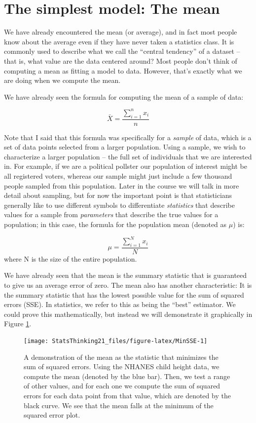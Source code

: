 \documentclass[12pt,]{book}
\theoremstyle{definition}
\theoremstyle{definition}
\theoremstyle{definition}
\theoremstyle{remark}
\begin{document}
\hypertarget{the-simplest-model-the-mean}{%
\section{The simplest model: The mean}\label{the-simplest-model-the-mean}}

We have already encountered the mean (or average), and in fact most people know about the average even if they have never taken a statistics class. It is commonly used to describe what we call the ``central tendency'' of a dataset -- that is, what value are the data centered around? Most people don't think of computing a mean as fitting a model to data. However, that's exactly what we are doing when we compute the mean.

We have already seen the formula for computing the mean of a sample of data:

\[
\bar{X} = \frac{\sum_{i=1}^{n}x_i}{n}
\]

Note that I said that this formula was specifically for a \emph{sample} of data, which is a set of data points selected from a larger population. Using a sample, we wish to characterize a larger population -- the full set of individuals that we are interested in. For example, if we are a political pollster our population of interest might be all registered voters, whereas our sample might just include a few thousand people sampled from this population. Later in the course we will talk in more detail about sampling, but for now the important point is that statisticians generally like to use different symbols to differentiate \emph{statistics} that describe values for a sample from \emph{parameters} that describe the true values for a population; in this case, the formula for the population mean (denoted as \(\mu\)) is:

\[
\mu = \frac{\sum_{i=1}^{N}x_i}{N}
\]
where N is the size of the entire population.

We have already seen that the mean is the summary statistic that is guaranteed to give us an average error of zero. The mean also has another characteristic: It is the summary statistic that has the lowest possible value for the sum of squared errors (SSE). In statistics, we refer to this as being the ``best'' estimator. We could prove this mathematically, but instead we will demonstrate it graphically in Figure \ref{fig:MinSSE}.

\begin{figure}
\texttt{[image: StatsThinking21\_files/figure-latex/MinSSE-1]} \caption{A demonstration of the mean as the statistic that minimizes the sum of squared errors.  Using the NHANES child height data, we compute the mean (denoted by the blue bar). Then, we test a range of other values, and for each one we compute the sum of squared errors for each data point from that value, which are denoted by the black curve.  We see that the mean falls at the minimum of the squared error plot.}\label{fig:MinSSE}
\end{figure}
\end{document}
